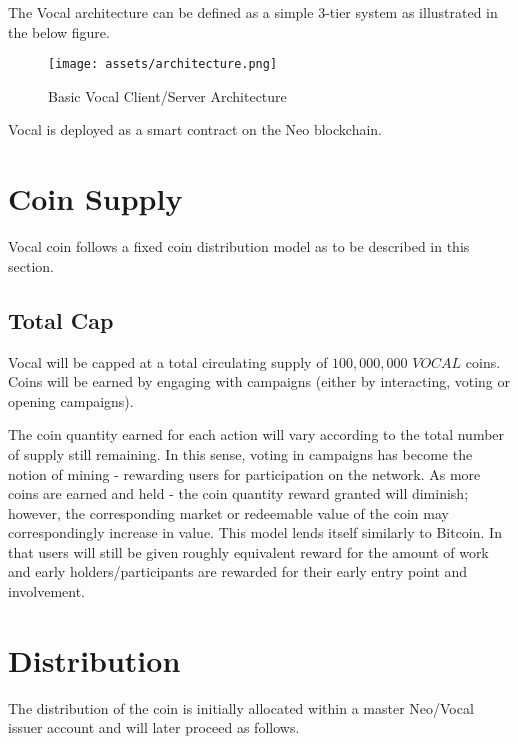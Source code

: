 \documentclass[conference]{IEEEtran}
\begin{document}
    The Vocal architecture can be defined as a simple 3-tier system as illustrated in the below figure.

    \begin{figure}[t]
      \texttt{[image: assets/architecture.png]}
      \caption{Basic Vocal Client/Server Architecture}
      \centering
    \end{figure}

     Vocal is deployed as a smart contract on the Neo blockchain.

    \section{Coin Supply}

   Vocal coin follows a fixed coin distribution model as to be described in this section.

    \subsection{Total Cap}
   Vocal will be capped at a total circulating supply of $100,000,000$ $VOCAL$ coins. Coins will be earned by engaging with campaigns (either by interacting, voting or opening campaigns).

     The coin quantity earned for each action will vary according to the total number of supply still remaining. In this sense, voting in campaigns has become the notion of mining - rewarding users for participation on the network. As more coins are earned and held - the coin quantity reward granted will diminish; however, the corresponding market or redeemable value of the coin may correspondingly increase in value. This model lends itself similarly to Bitcoin. In that users will still be given roughly equivalent reward for the amount of work and early holders/participants are rewarded for their early entry point and involvement.

    \section{Distribution}

    The distribution of the coin is initially allocated within a master Neo/Vocal issuer account and will later proceed as follows.
\end{document}
